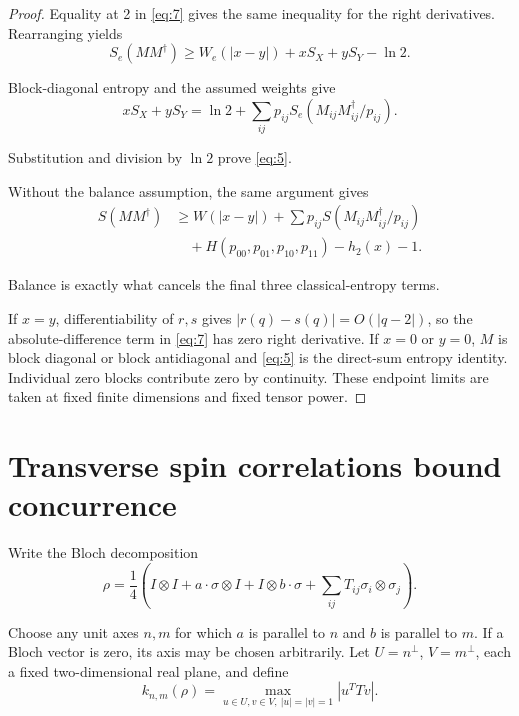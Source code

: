 \documentclass[10pt,letterpaper]{article}
\begin{document}
\begin{proof}
Equality at 2 in \eqref{eq:7} gives the same inequality for the right derivatives. Rearranging yields
\begin{equation}
S_e(MM^\dagger)\ge W_e(|x-y|)+xS_X+yS_Y-\ln2.
\label{eq:10}
\end{equation}

Block-diagonal entropy and the assumed weights give
\begin{equation}
xS_X+yS_Y=\ln2+\sum_{ij}p_{ij}S_e(M_{ij}M_{ij}^\dagger/p_{ij}).
\label{eq:11}
\end{equation}

Substitution and division by \(\ln2\) prove \eqref{eq:5}.

Without the balance assumption, the same argument gives
\begin{equation}
\begin{aligned}
S(MM^\dagger)&\ge W(|x-y|)+\sum p_{ij}S(M_{ij}M_{ij}^\dagger/p_{ij})
\\
&\quad{}+H(p_{00},p_{01},p_{10},p_{11})-h_2(x)-1.
\end{aligned}
\label{eq:12}
\end{equation}

Balance is exactly what cancels the final three classical-entropy terms.

If \(x=y\), differentiability of \(r,s\) gives \(|r(q)-s(q)|=O(|q-2|)\), so the absolute-difference term in \eqref{eq:7} has zero right derivative. If \(x=0\) or \(y=0\), \(M\) is block diagonal or block antidiagonal and \eqref{eq:5} is the direct-sum entropy identity. Individual zero blocks contribute zero by continuity. These endpoint limits are taken at fixed finite dimensions and fixed tensor power. \end{proof}

\section{Transverse spin correlations bound concurrence}

Write the Bloch decomposition
\begin{equation*}
\rho=\frac14\left(I\otimes I+a\cdot\sigma\otimes I+I\otimes b\cdot\sigma
+\sum_{ij}T_{ij}\sigma_i\otimes\sigma_j\right).
\end{equation*}

Choose any unit axes \(n,m\) for which \(a\) is parallel to \(n\) and \(b\) is parallel to \(m\). If a Bloch vector is zero, its axis may be chosen arbitrarily. Let \(U=n^\perp\), \(V=m^\perp\), each a fixed two-dimensional real plane, and define
\begin{equation*}
k_{n,m}(\rho)=\max_{u\in U,v\in V,\ |u|=|v|=1}|u^TTv|.
\end{equation*}
\end{document}
